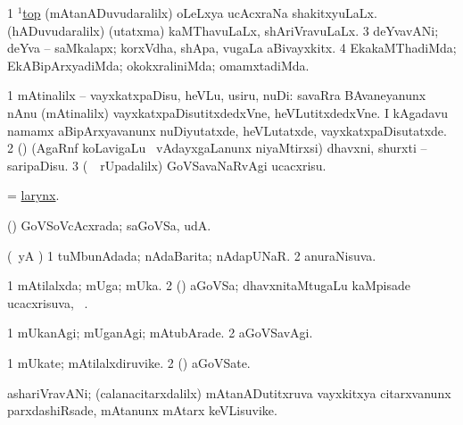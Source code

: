 \noindent 
\gl{\pagu}
\expl{}
\bmng
\bnum
\num{1}  \hyperref{kandict_t.pdf}{T}{top(1)16}{$^1$top}  
  
\banum
{} (mAtanADuvudaralilx) oLeLxya ucAcxraNa shakitxyuLaLx. 
 (hADuvudaralilx) (utatxma) kaMThavuLaLx, shAriVravuLaLx. 
\eanum
\numie
\num{3}  deYvavANi; deYva -- saMkalapx; korxVdha, shApa, \mo vugaLa aBivayxkitx. 
\num{4}  EkakaMThadiMda; EkABipArxyadiMda; okokxraliniMda; omamxtadiMda. 
\enum
\emng
\eentry

\bentry
{} 
\gl{\sakirx}
\expl{}
\bmng
\bnum
\num{1} mAtinalilx -- vayxkatxpaDisu, heVLu, usiru, nuDi:  savaRra BAvaneyanunx nAnu (mAtinalilx) vayxkatxpaDisutitxdedxVne, heVLutitxdedxVne.  I kAgadavu namamx aBipArxyavanunx nuDiyutatxde, heVLutatxde, vayxkatxpaDisutatxde. 
\num{2} (\saM) (AgaRnf koLavigaLu \mo\ vAdayxgaLanunx niyaMtirxsi) dhavxni, shurxti -- saripaDisu. 
\num{3} (\kanmu\ \BUkaq\ rUpadalilx) GoVSavaNaRvAgi ucacxrisu. 
\enum
\emng
\eentry

\bentry 
{} 
\gl{\nA}
\expl{}
\bmng
 = \hyperref{kandict_l.pdf}{L}{larynx}{larynx}. 
\emng
\eentry

\bentry
{} 
\gl{\gu}
\expl{}
\bmng
 (\dhavxni) GoVSoVcAcxrada; saGoVSa, udA.  
\emng
\eentry

\bentry 
{} 
\gl{\gu}
\expl{}
\bmng
 (\kAparx\ yA \alaMshA) 
\bnum
\num{1} tuMbunAdada; nAdaBarita; nAdapUNaR. 
\num{2} anuraNisuva. 
\enum
\emng
\eentry

\bentry 
{} 
\gl{\gu}
\expl{}
\bmng
\bnum
\num{1} mAtilalxda; mUga; mUka. 
\num{2} (\dhavxni) aGoVSa; dhavxnitaMtugaLu kaMpisade ucacxrisuva, \udA\ . 
\enum
\emng
\eentry

\bentry
{} 
\gl{\kirxvi}
\expl{}
\bmng
\bnum
\num{1} mUkanAgi; mUganAgi; mAtubArade. 
\num{2} aGoVSavAgi. 
\enum
\emng
\eentry

\bentry
{} 
\gl{\nA}
\expl{}
\bmng
\bnum
\num{1} mUkate; mAtilalxdiruvike. 
\num{2} (\dhavxni) aGoVSate. 
\enum
\emng
\eentry

\bentry
{} 
\gl{\nA}
\expl{}
\bmng
 ashariVravANi; (calanacitarxdalilx) mAtanADutitxruva vayxkitxya citarxvanunx parxdashiRsade, mAtanunx mAtarx keVLisuvike. 
\emng
\eentry

